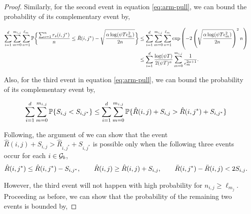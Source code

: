 \begin{proof}
Similarly, for the second event in equation \ref{eq:arm-pull}, we can bound the probability of its complementary event by,

\begin{align*}
\sum_{i=1}^{d}\sum_{m=0}^{m_{i,j}}\sum_{n =1}^{\ell_{m_{}}}\mathbb{P}\bigg\lbrace \dfrac{\sum_{s=1}^{n} r_{s}(i,j^*)}{n} \leq \bar{R}(i,j^*) - \sqrt{\dfrac{\alpha\log(\psi T\epsilon_{m_{}}^2)}{2n}} \bigg\rbrace &\leq \sum_{i=1}^{d}\sum_{m=0}^{m_{i,j}}\sum_{n=1}^{\ell_{m_{}}}\exp\left(-2\left(\sqrt{\dfrac{\alpha\log(\psi T\epsilon_{m_{}}^2)}{2n}}\right)^2n_{} \right)\\
&\leq \sum_{i=1}^{d}\dfrac{\log(\psi T )}{2(\psi T)^{\alpha}}\sum_{m=0}^{m_{i,j}}\dfrac{1}{\epsilon_{m_{}}^{2\alpha +1}}.
\end{align*}


Also, for the third event in equation \ref{eq:arm-pull}, we can bound the probability of its complementary event by,

\begin{align*}
\sum_{i=1}^{d}\sum_{m=0}^{m_{i,j}}\mathbb{P}\lbrace S_{i,j} < S_{i,j^*} \rbrace &\leq \sum_{i=1}^{d}\sum_{m=0}^{m_{i,j}}\mathbb{P} \lbrace \hat{R}(i,j) + S_{i,j} > \hat{R}(i,j^*) + S_{i,j^*}\rbrace \\
\end{align*}



Following, the argument of \citet{auer2002finite} we can show that  the event $\hat{R}(i,j) + S_{i,j} > \hat{R}_{i,j^*} + S_{i,j^*}$ is possible only when the following three events occur for each $i\in\mathcal{G}_b$, 
\begin{align*}
\hat{R}(i,j^*) \leq \hat{R}(i,j^*) - S_{i,j^*}  , \hspace*{2em}  \hat{R}(i,j) \geq \hat{R}(i,j) + S_{i,j}, \hspace*{2em}  \bar{R}(i,j^*)-\bar{R}(i,j) < 2 S_{i,j} . 
\end{align*}
 
However, the third event will not happen with high probability for $n_{i,j}\geq \ell_{m_{j}}$. Proceeding as before, we can show that the probability of the remaining two events is bounded by,


\end{proof}
